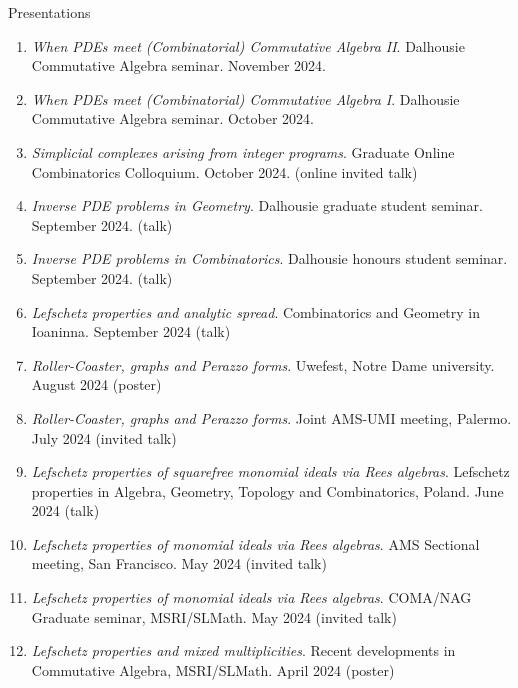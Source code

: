 \documentclass[12pt]{resume} %
\begin{document}

 
\begin{rSection}{Presentations}
    \begin{enumerate}
        \item \textit{When PDEs meet (Combinatorial) Commutative Algebra II}. Dalhousie Commutative Algebra seminar. November 2024.
        \item \textit{When PDEs meet (Combinatorial) Commutative Algebra I}. Dalhousie Commutative Algebra seminar. October 2024.
        \item \textit{Simplicial complexes arising from integer programs}. Graduate Online Combinatorics Colloquium. October 2024. (online invited talk)
        \item \textit{Inverse PDE problems in Geometry}. Dalhousie graduate student seminar. September 2024. (talk)
        \item \textit{Inverse PDE problems in Combinatorics}. Dalhousie honours student seminar. September 2024. (talk)
        \item \textit{Lefschetz properties and analytic spread}. Combinatorics and Geometry in Ioaninna. September 2024 (talk)
        \item \textit{Roller-Coaster, graphs and Perazzo forms}. Uwefest, Notre Dame university. August 2024 (poster)
        \item \textit{Roller-Coaster, graphs and Perazzo forms}. Joint AMS-UMI meeting, Palermo. July 2024 (invited talk)
        \item \textit{Lefschetz properties of squarefree monomial ideals via Rees algebras}. Lefschetz properties in Algebra, Geometry, Topology and Combinatorics, Poland. June 2024 (talk) 
        \item \textit{Lefschetz properties of monomial ideals via Rees algebras}. AMS Sectional meeting, San Francisco. May 2024 (invited talk) 
        \item \textit{Lefschetz properties of monomial ideals via Rees algebras}. COMA/NAG Graduate seminar, \newline MSRI/SLMath. May 2024 (invited talk) 
        \item \textit{Lefschetz properties and mixed multiplicities}. Recent developments in Commutative Algebra, MSRI/SLMath. April 2024 (poster)

\end{enumerate}
\end{rSection}
\end{document}
